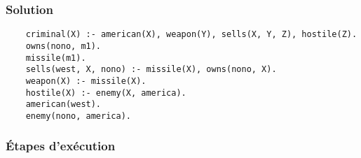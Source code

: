     \subsubsection{Solution}
    
    
    \begin{lstlisting}
    criminal(X) :- american(X), weapon(Y), sells(X, Y, Z), hostile(Z).
    owns(nono, m1).
    missile(m1).
    sells(west, X, nono) :- missile(X), owns(nono, X).
    weapon(X) :- missile(X).
    hostile(X) :- enemy(X, america).
    american(west).
    enemy(nono, america).
    \end{lstlisting}
    
    \subsubsection{Étapes d'exécution}
